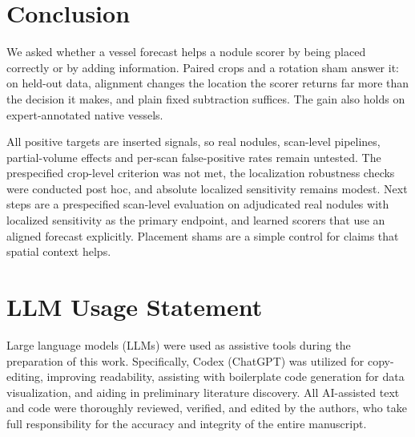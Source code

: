 \section{Conclusion}
\label{sec:conclusion}
We asked whether a vessel forecast helps a nodule scorer by being placed correctly or by adding information. Paired crops and a rotation sham answer it: on held-out data, alignment changes the location the scorer returns far more than the decision it makes, and plain fixed subtraction suffices. The gain also holds on expert-annotated native vessels.

All positive targets are inserted signals, so real nodules, scan-level pipelines, partial-volume effects and per-scan false-positive rates remain untested. The prespecified crop-level criterion was not met, the localization robustness checks were conducted post hoc, and absolute localized sensitivity remains modest. Next steps are a prespecified scan-level evaluation on adjudicated real nodules with localized sensitivity as the primary endpoint, and learned scorers that use an aligned forecast explicitly. Placement shams are a simple control for claims that spatial context helps.

\FloatBarrier
\section*{LLM Usage Statement}
Large language models (LLMs) were used as assistive tools during the preparation of this work. Specifically, Codex (ChatGPT) was utilized for copy-editing, improving readability, assisting with boilerplate code generation for data visualization, and aiding in preliminary literature discovery. All AI-assisted text and code were thoroughly reviewed, verified, and edited by the authors, who take full responsibility for the accuracy and integrity of the entire manuscript.

